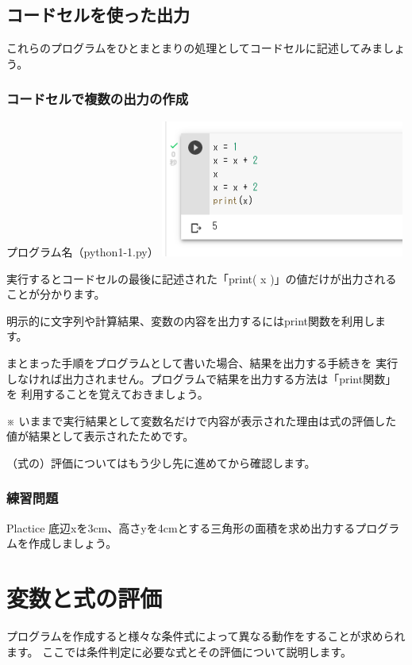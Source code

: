 \documentclass[11pt,a4paper,dvipdfmx,titlepage]{jsreport}
\begin{document}
\subsection{コードセルを使った出力}
これらのプログラムをひとまとまりの処理としてコードセルに記述してみましょう。

\subsubsection{コードセルで複数の出力の作成}

\begin{grabox}{プログラム名（python1-1.py）}
\includegraphics[width=8cm]{images/colab11.png}
\end{grabox}
実行するとコードセルの最後に記述された「print( x )」の値だけが出力されることが分かります。

明示的に文字列や計算結果、変数の内容を出力するにはprint関数を利用します。

まとまった手順をプログラムとして書いた場合、結果を出力する手続きを
実行しなければ出力されません。プログラムで結果を出力する方法は「print関数」を
利用することを覚えておきましょう。


※ いままで実行結果として変数名だけで内容が表示された理由は式の評価した値が結果として表示されたためです。

 （式の）評価についてはもう少し先に進めてから確認します。

\subsubsection{練習問題}
\begin{plabox}{Plactice}
底辺xを3cm、高さyを4cmとする三角形の面積を求め出力するプログラムを作成しましょう。

\end{plabox}


\section{変数と式の評価}
プログラムを作成すると様々な条件式によって異なる動作をすることが求められます。
ここでは条件判定に必要な式とその評価について説明します。
\end{document}
